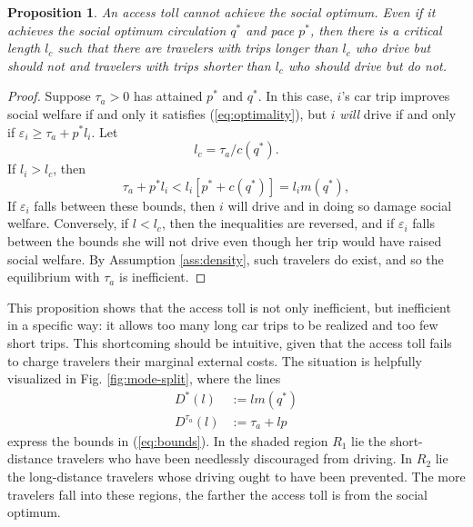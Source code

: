 \documentclass[preprint,authoryear]{elsarticle}
\newcommand{\taua}{\tau_a}
\newcommand{\ve}{\varepsilon}
\newtheorem{proposition}{Proposition}
\begin{document}
\begin{proposition}
	An access toll cannot achieve the social optimum. Even if it achieves the social optimum circulation $q^*$ and pace $p^*$, then there is a critical length $l_c$ such that there are travelers with trips longer than $l_c$ who drive but should not and travelers with trips shorter than $l_c$ who should drive but do not. 
\end{proposition}

\begin{proof}

	Suppose $\taua>0$ has attained $p^*$ and $q^*$. In this case, $i$'s car trip improves social welfare if and only it satisfies (\ref{eq:optimality}), but $i$ \emph{will} drive if and only if $\ve_i\geq\taua+p^* l_i$. Let 
	\begin{equation}
		l_c=\taua/c(q^*).	
	\end{equation}
	If $l_i>l_c$, then 
	\begin{equation}\label{eq:bounds}
		\taua + p^*l_i < l_i[p^*+c(q^*)] = l_i m(q^*),
	\end{equation}
	If $\ve_i$ falls between these bounds, then $i$ will drive and in doing so damage social welfare. Conversely, if $l<l_c$, then the inequalities are reversed, and if $\ve_i$ falls between the  bounds she will not drive even though her trip would have raised social welfare. By Assumption \ref{ass:density}, such travelers do exist, and so the equilibrium with $\taua$ is inefficient.

\end{proof}

This proposition shows that the access toll is not only inefficient, but inefficient in a specific way: it allows too many long car trips to be realized and too few short trips. This shortcoming should be intuitive, given that the access toll fails to charge travelers their marginal external costs. The situation is helpfully visualized in Fig. \ref{fig:mode-split}, where the lines
\begin{align}
D^*(l) &:=  l m(q^*)\\
D^{\taua}(l) &:= \taua + l p
\end{align}
express the bounds in (\ref{eq:bounds}). In the shaded region $R_1$ lie the short-distance travelers who have been needlessly discouraged from driving. In $R_2$ lie the long-distance travelers whose driving ought to have been prevented. The more travelers fall into these regions, the farther the access toll is from the social optimum.
\end{document}
